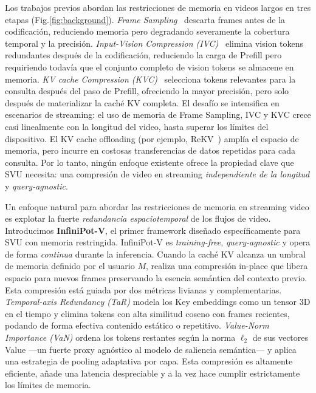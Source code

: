 Los trabajos previos abordan las restricciones de memoria en videos largos en tres etapas (Fig.\ref{fig:background}). {\em Frame Sampling}~\cite{feichtenhofer2019slowfastnetworksvideorecognition} descarta frames antes de la codificación, reduciendo memoria pero degradando severamente la cobertura temporal y la precisión. {\em Input-Vision Compression (IVC)}~\cite{shen2024longvu,tao2024dycokedynamiccompressiontokens} elimina vision tokens redundantes después de la codificación, reduciendo la carga de Prefill pero requiriendo todavía que el conjunto completo de vision tokens se almacene en memoria. {\em KV cache Compression (KVC)}~\cite{li2024snapkv,fu2024headkv} selecciona tokens relevantes para la consulta después del paso de Prefill, ofreciendo la mayor precisión, pero solo después de materializar la caché KV completa. El desafío se intensifica en escenarios de streaming: el uso de memoria de Frame Sampling, IVC y KVC crece casi linealmente con la longitud del video, hasta superar los límites del dispositivo. El KV cache offloading (por ejemplo, ReKV~\cite{Shangzhe2025streaming}) amplía el espacio de memoria, pero incurre en costosas transferencias de datos repetidas para cada consulta. Por lo tanto, ningún enfoque existente ofrece la propiedad clave que SVU necesita: una compresión de video en streaming \textit{independiente de la longitud} y \textit{query-agnostic}.


Un enfoque natural para abordar las restricciones de memoria en streaming video es explotar la fuerte \textit{redundancia espaciotemporal} de los flujos de video. Introducimos \textbf{InfiniPot-V}, el primer framework diseñado específicamente para SVU con memoria restringida. InfiniPot-V es \textit{training-free}, \textit{query-agnostic} y opera de forma \textit{continua} durante la inferencia. Cuando la caché KV alcanza un umbral de memoria definido por el usuario \(M\), realiza una compresión in-place que libera espacio para nuevos frames preservando la esencia semántica del contexto previo. Esta compresión está guiada por dos métricas livianas y complementarias. \textit{Temporal-axis Redundancy (TaR)} modela los Key embeddings como un tensor 3D en el tiempo y elimina tokens con alta similitud coseno con frames recientes, podando de forma efectiva contenido estático o repetitivo. \textit{Value-Norm Importance (VaN)} ordena los tokens restantes según la norma \(\ell_2\) de sus vectores Value ---un fuerte proxy agnóstico al modelo de saliencia semántica--- y aplica una estrategia de pooling adaptativa por capa. Esta compresión es altamente eficiente, añade una latencia despreciable y a la vez hace cumplir estrictamente los límites de memoria.

